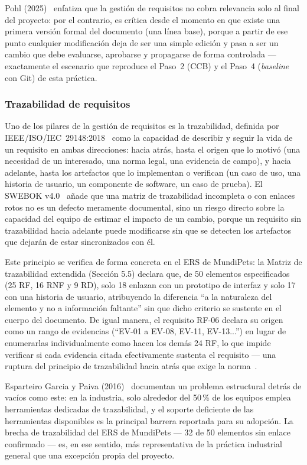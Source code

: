 \documentclass[journal,onecolumn]{IEEEtran}
\begin{document}
	Pohl (2025)~\cite{pohl2025} enfatiza que la gestión de requisitos
	no cobra relevancia solo al final del proyecto: por el contrario,
	es crítica desde el momento en que existe una primera versión
	formal del documento (una línea base), porque a partir de ese
	punto cualquier modificación deja de ser una simple edición y pasa
	a ser un cambio que debe evaluarse, aprobarse y propagarse de
	forma controlada --- exactamente el escenario que reproduce el
	Paso~2 (CCB) y el Paso~4 (\emph{baseline} con Git) de esta
	práctica.
	
	\subsubsection{Trazabilidad de requisitos}
	
	Uno de los pilares de la gestión de requisitos es la
	trazabilidad, definida por IEEE/ISO/IEC~29148:2018~\cite{ieee29148_2018}
	como la capacidad de describir y seguir la vida de un requisito en
	ambas direcciones: hacia atrás, hasta el origen que lo motivó (una
	necesidad de un interesado, una norma legal, una evidencia de
	campo), y hacia adelante, hasta los artefactos que lo implementan
	o verifican (un caso de uso, una historia de usuario, un
	componente de software, un caso de prueba). El SWEBOK
	v4.0~\cite{swebok2024} añade que una matriz de trazabilidad
	incompleta o con enlaces rotos no es un defecto meramente
	documental, sino un riesgo directo sobre la capacidad del equipo
	de estimar el impacto de un cambio, porque un requisito sin
	trazabilidad hacia adelante puede modificarse sin que se detecten
	los artefactos que dejarán de estar sincronizados con él.
	
	Este principio se verifica de forma concreta en el ERS de
	MundiPets: la Matriz de trazabilidad extendida (Sección 5.5)
	declara que, de 50 elementos especificados (25 RF, 16 RNF y 9 RD),
	solo 18 enlazan con un prototipo de interfaz y solo 17 con una
	historia de usuario, atribuyendo la diferencia ``a la naturaleza
	del elemento y no a información faltante'' sin que dicho criterio
	se sustente en el cuerpo del documento. De igual manera, el
	requisito RF-06 declara su origen como un rango de evidencias
	(``EV-01 a EV-08, EV-11, EV-13...'') en lugar de enumerarlas
	individualmente como hacen los demás 24 RF, lo que impide
	verificar si cada evidencia citada efectivamente sustenta el
	requisito --- una ruptura del principio de trazabilidad hacia
	atrás que exige la norma~\cite{ieee29148_2018}.
	
	Esparteiro Garcia y Paiva (2016)~\cite{garcia2016} documentan un
	problema estructural detrás de vacíos como este: en la industria,
	solo alrededor del 50\,\% de los equipos emplea herramientas
	dedicadas de trazabilidad, y el soporte deficiente de las
	herramientas disponibles es la principal barrera reportada para su
	adopción. La brecha de trazabilidad del ERS de MundiPets --- 32 de
	50 elementos sin enlace confirmado --- es, en ese sentido, más
	representativa de la práctica industrial general que una excepción
	propia del proyecto.
	
\end{document}

